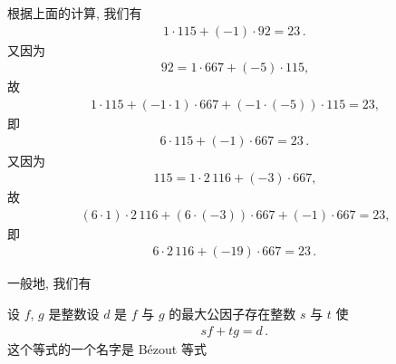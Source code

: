 根据上面的计算, 我们有
\begin{align*}
    1 \cdot 115 + (-1) \cdot 92 = 23 \period
\end{align*}
又因为
\begin{align*}
    92 = 1 \cdot 667 + (-5) \cdot 115,
\end{align*}
故
\begin{align*}
    1 \cdot 115 + (-1 \cdot 1) \cdot 667 + (-1 \cdot (-5)) \cdot 115 = 23,
\end{align*}
即
\begin{align*}
    6 \cdot 115 + (-1) \cdot 667 = 23 \period
\end{align*}
又因为
\begin{align*}
    115 = 1 \cdot 2\,116 + (-3) \cdot 667,
\end{align*}
故
\begin{align*}
    (6 \cdot 1) \cdot 2\,116 + (6 \cdot (-3)) \cdot 667 + (-1) \cdot 667 = 23,
\end{align*}
即
\begin{align*}
    6 \cdot 2\,116 + (-19) \cdot 667 = 23 \period
\end{align*}

一般地, 我们有
\begin{proposition}
    设 $f$, $g$ 是整数\period 设 $d$ 是 $f$ 与 $g$ 的最大公因子\period 存在整数 $s$ 与 $t$ 使
    \begin{align*}
        sf + tg = d \period
    \end{align*}
    这个等式的一个名字是 Bézout 等式 \period
\end{proposition}

